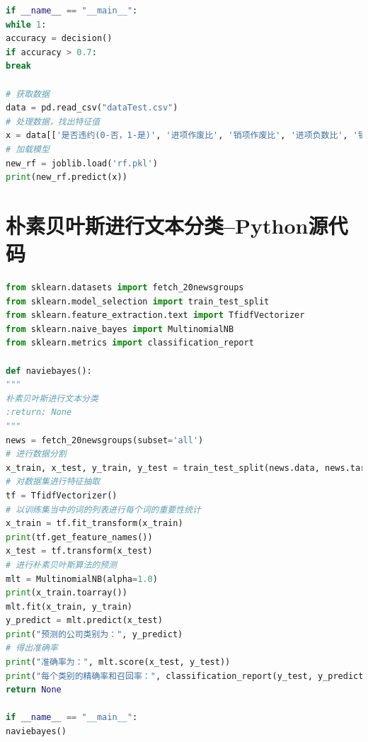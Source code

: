 \documentclass[withoutpreface,bwprint]{cumcmthesis} %
\begin{document}
\begin{appendices}
\begin{lstlisting}[language=Python]
if __name__ == "__main__":
while 1:
accuracy = decision()
if accuracy > 0.7:
break

# 获取数据
data = pd.read_csv("dataTest.csv")
# 处理数据，找出特征值
x = data[['是否违约(0-否，1-是)', '进项作废比', '销项作废比', '进项负数比', '销项负数比', '年均利润']]
# 加载模型
new_rf = joblib.load('rf.pkl')
print(new_rf.predict(x))
\end{lstlisting}


\section{朴素贝叶斯进行文本分类--Python源代码}
\begin{lstlisting}[language=Python]
from sklearn.datasets import fetch_20newsgroups
from sklearn.model_selection import train_test_split
from sklearn.feature_extraction.text import TfidfVectorizer
from sklearn.naive_bayes import MultinomialNB
from sklearn.metrics import classification_report

def naviebayes():
"""
朴素贝叶斯进行文本分类
:return: None
"""
news = fetch_20newsgroups(subset='all')
# 进行数据分割
x_train, x_test, y_train, y_test = train_test_split(news.data, news.target, test_size=0.25)
# 对数据集进行特征抽取
tf = TfidfVectorizer()
# 以训练集当中的词的列表进行每个词的重要性统计
x_train = tf.fit_transform(x_train)
print(tf.get_feature_names())
x_test = tf.transform(x_test)
# 进行朴素贝叶斯算法的预测
mlt = MultinomialNB(alpha=1.0)
print(x_train.toarray())
mlt.fit(x_train, y_train)
y_predict = mlt.predict(x_test)
print("预测的公司类别为：", y_predict)
# 得出准确率
print("准确率为：", mlt.score(x_test, y_test))
print("每个类别的精确率和召回率：", classification_report(y_test, y_predict, target_names=news.target_names))
return None

if __name__ == "__main__":
naviebayes()
\end{lstlisting}
 

\newpage

\end{appendices}
\end{document}
